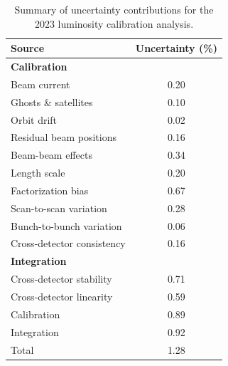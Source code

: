 
\begin{table}[!h]
    \centering
    \caption{Summary of uncertainty contributions for the 2023 luminosity calibration analysis.}
    \label{tab:sum}
    \begin{tabular}{lc}
        \textbf{Source} & \textbf{Uncertainty} (\%) \\ \hline
        \textbf{Calibration} & \\
        Beam current & 0.20 \\
        Ghosts \& satellites & 0.10 \\
        Orbit drift & 0.02 \\
        Residual beam positions & 0.16 \\
        Beam-beam effects & 0.34 \\
        Length scale & 0.20 \\
        Factorization bias & 0.67 \\
        Scan-to-scan variation & 0.28 \\
        Bunch-to-bunch variation & 0.06 \\
        Cross-detector consistency & 0.16 \\ \hline
        \textbf{Integration} & \\
        Cross-detector stability & 0.71 \\
        Cross-detector linearity & 0.59 \\ %
        \hline \hline
        Calibration & 0.89 \\
        Integration & 0.92 \\ %
        \hline
        Total & 1.28 \\
    \end{tabular}
\end{table}
